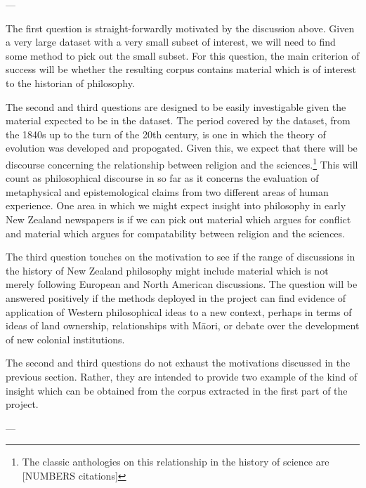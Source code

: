 ---


The first question is straight-forwardly motivated by the discussion above. Given a very large dataset with a very small subset of interest, we will need to find some method to pick out the small subset. For this question, the main criterion of success will be whether the resulting corpus contains material which is of interest to the historian of philosophy. %


The second and third questions are designed to be easily investigable given the material expected to be in the dataset. The period covered by the dataset, from the 1840s up to the turn of the 20th century, is one in which the theory of evolution was developed and propogated. Given this, we expect that there will be discourse concerning the relationship between religion and the sciences.\footnote{The classic anthologies on this relationship in the history of science are [NUMBERS citations]}
This will count as philosophical discourse in so far as it concerns the evaluation of metaphysical and epistemological claims from two different areas of human experience. One area in which we might expect insight into philosophy in early New Zealand newspapers is if we can pick out material which argues for conflict and material which argues for compatability between religion and the sciences.

The third question touches on the motivation to see if the range of discussions in the history of New Zealand philosophy might include material which is not merely following European and North American discussions. The question will be answered positively if the methods deployed in the project can find evidence of application of Western philosophical ideas to a new context, perhaps in terms of ideas of land ownership, relationships with Māori, or debate over the development of new colonial institutions.

The second and third questions do not exhaust the motivations discussed in the previous section. Rather, they are intended to provide two example of the kind of insight which can be obtained from the corpus extracted in the first part of the project.

---

